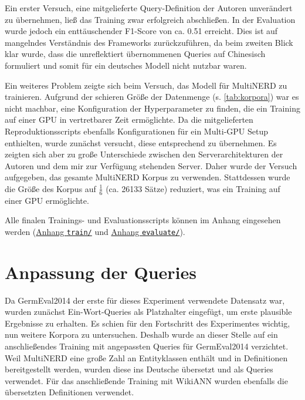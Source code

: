 Ein erster Versuch, eine mitgelieferte Query-Definition der Autoren unverändert zu übernehmen, ließ das Training zwar erfolgreich abschließen. In der Evaluation wurde jedoch ein enttäuschender F1-Score von ca. 0.51 erreicht. Dies ist auf mangelndes Verständnis des Frameworks zurückzuführen, da beim zweiten Blick klar wurde, dass die unreflektiert übernommenen Queries auf Chinesisch formuliert und somit für ein deutsches Modell nicht nutzbar waren.

Ein weiteres Problem zeigte sich beim Versuch, das Modell für MultiNERD zu trainieren. Aufgrund der schieren Größe der Datenmenge (s. \autoref{tab:korpora}) war es nicht machbar, eine Konfiguration der Hyperparameter zu finden, die ein Training auf einer GPU in vertretbarer Zeit ermöglichte. Da die mitgelieferten Reproduktionsscripts ebenfalls Konfigurationen für ein Multi-GPU Setup enthielten, wurde zunächst versucht, diese entsprechend zu übernehmen. Es zeigten sich aber zu große Unterschiede zwischen den Serverarchitekturen der Autoren und dem mir zur Verfügung stehenden Server. Daher wurde der Versuch aufgegeben, das gesamte MultiNERD Korpus zu verwenden. Stattdessen wurde die Größe des Korpus auf \(\frac{1}{6}\) (ca. 26133 Sätze) reduziert, was ein Training auf einer GPU ermöglichte.

Alle finalen Trainings- und Evaluationsscripts können im Anhang eingesehen werden (\hyperref[app:train]{Anhang \texttt{train/}} und \hyperref[app:evaluate]{Anhang \texttt{evaluate/}}).


\section{Anpassung der Queries}
\label{ch:Training:sec:Anpassung_Queries}


Da GermEval2014 der erste für dieses Experiment verwendete Datensatz war, wurden zunächst Ein-Wort-Queries als Platzhalter eingefügt, um erste plausible Ergebnisse zu erhalten. Es schien für den Fortschritt des Experimentes wichtig, nun weitere Korpora zu untersuchen. Deshalb wurde an dieser Stelle auf ein anschließendes Training mit angepassten Queries für GermEval2014 verzichtet. Weil MultiNERD eine große Zahl an Entityklassen enthält und in \textcite{multinerd} Definitionen bereitgestellt werden, wurden diese ins Deutsche übersetzt und als Queries verwendet. Für das anschließende Training mit WikiANN wurden ebenfalls die übersetzten Definitionen verwendet.

